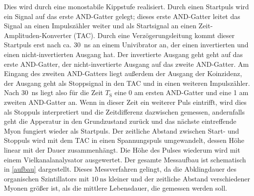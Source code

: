 Dies wird durch eine monostabile Kippstufe realisiert. Durch einen Startpuls wird ein Signal auf das erste AND-Gatter gelegt; dieses erste AND-Gatter leitet das Signal an einen Impulszähler weiter und als Startsignal an einen Zeit-Amplituden-Konverter (TAC). Durch eine Verzögerungsleitung kommt dieser Startpuls erst nach ca. \SI{30}{\nano\second} an einem Univibrator an, der einen invertierten und einen nicht-invertierten Ausgang hat. Der invertierte Ausgang geht geht auf das erste AND-Gatter, der nicht-invertierte Ausgang auf das zweite AND-Gatter. Am Eingang des zweiten AND-Gatters liegt außerdem der Ausgang der Koinzidenz, der Ausgang geht als Stoppsignal in den TAC und in einen weiteren Impulszähler. Nach \SI{30}{\nano\second} liegt also für die Zeit $T_\text{S}$ eine 0 am ersten AND-Gatter und eine 1 am zweiten AND-Gatter an. Wenn in dieser Zeit ein weiterer Puls eintrifft, wird dies als Stoppuls interpretiert und die Zeitdifferenz dazwischen gemessen, andernfalls geht die Apperatur in den Grundzustand zurück und das nächste eintreffende Myon fungiert wieder als Startpuls. Der zeitliche Abstand zwischen Start- und Stoppuls wird mit dem TAC in einen Spannungspuls umgewandelt, dessen Höhe linear mit der Dauer zusammenhängt. Die Höhe des Pulses wiederum wird mit einem Vielkanalanalysator ausgewertet. Der gesamte Messaufbau ist schematisch in \autoref{aufbau} dargestellt. Dieses Messverfahren gelingt, da die Abklingdauer des organischen Szintillators mit $\SI{10}{\nano\second}$ kleiner und der zeitliche Abstand verschiedener Myonen größer ist, als die mittlere Lebensdauer, die gemessen werden soll.
